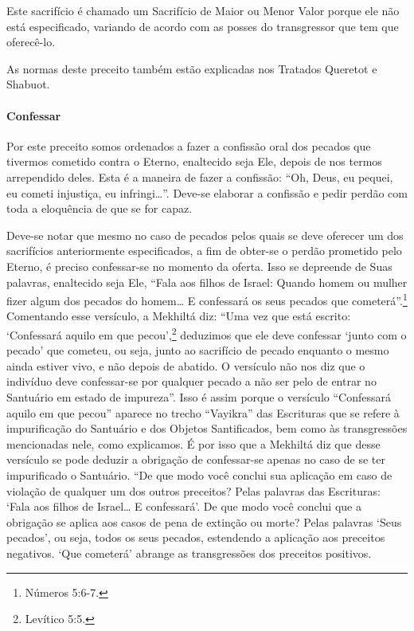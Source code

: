 Este sacrifício é chamado um Sacrifício de Maior ou Menor Valor porque
ele não está especificado, variando de acordo com as posses do
transgressor que tem que oferecê-lo.

As normas deste preceito também estão explicadas nos Tratados Queretot
e Shabuot.

\paragraph{Confessar}

Por este preceito somos ordenados a fazer a confissão oral dos pecados
que tivermos cometido contra o Eterno, enaltecido seja Ele, depois de
nos termos arrependido deles. Esta é a maneira de fazer a confissão:
``Oh, Deus, eu pequei, eu cometi injustiça, eu infringi\ldots{}''. Deve-se elaborar a
confissão e pedir perdão com toda a eloquência de que se for capaz.

Deve-se notar que mesmo no caso de pecados pelos quais se deve oferecer
um dos sacrifícios anteriormente especificados, a fim de obter-se o
perdão prometido pelo Eterno, é preciso confessar-se no momento da
oferta. Isso se depreende de Suas palavras, enaltecido seja Ele, ``Fala
aos filhos de Israel: Quando homem ou mulher fizer algum dos pecados do
homem\ldots{} E confessará os seus pecados que cometerá''.\footnote{Números 5:6-7.}
Comentando esse versículo, a Mekhiltá diz: ``Uma vez que está escrito:
`Confessará aquilo em que pecou',\footnote{Levítico 5:5.} deduzimos que ele deve
confessar `junto com o pecado' que cometeu, ou seja, junto ao sacrifício
de pecado enquanto o mesmo ainda estiver vivo, e não depois de abatido.
O versículo não nos diz que o indivíduo deve confessar-se por qualquer
pecado a não ser pelo de entrar no Santuário em estado de impureza''.
Isso é assim porque o versículo ``Confessará aquilo em que pecou''
aparece no trecho ``Vayikra'' das Escrituras que se refere à
impurificação do Santuário e dos Objetos Santificados, bem como às
transgressões mencionadas nele, como explicamos. É por isso que a
Mekhiltá diz que desse versículo se pode deduzir a obrigação de
confessar-se apenas no caso de se ter impurificado o Santuário. ``De que
modo você conclui sua aplicação em caso de violação de qualquer um dos
outros preceitos? Pelas palavras das Escrituras: `Fala aos filhos de
Israel\ldots{} E confessará'. De que modo você conclui que a obrigação se
aplica aos casos de pena de extinção ou morte? Pelas palavras `Seus
pecados', ou seja, todos os seus pecados, estendendo a aplicação aos
preceitos negativos. `Que cometerá' abrange as transgressões dos
preceitos positivos.


